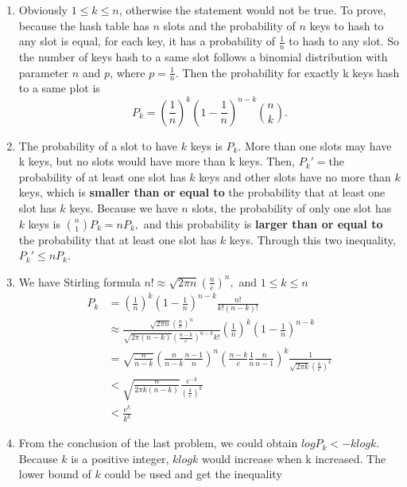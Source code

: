 \documentclass{assignment}
\begin{document}
    \maketitle

    \newpage

    \begin{homeworkProblem}
	\begin{enumerate}
	\item
	Obviously $1 \leq k \leq n$, otherwise the statement would not be true. To prove, because the hash table has $n$ slots and the probability of $n$ keys to hash to any slot is equal, for each key, it has a probability of $\frac{1}{n}$ to hash to any slot. So the number of keys hash to a same slot follows a binomial distribution with parameter $n$ and $p$, where $p=\frac{1}{n}$. Then the probability for exactly k keys hash to a same plot is $$P_k = \left(\frac{1}{n}\right)^k \left(1-\frac{1}{n}\right)^{n-k} \binom n k.$$
	\item The probability of a slot to have $k$ keys is $P_k$. More than one slots may have k keys, but no slots would have more than k keys. Then, $P_k' = $the probability of at least one slot has $k$ keys and other slots have no more than $k$ keys, which is \textbf{smaller than or equal to} the probability that at least one slot has $k$ keys. Because we have $n$ slots, the probability of only one slot has $k$ keys is $\binom n 1 P_k = nP_k,$ and this probability is \textbf{larger than or equal to} the probability that at least one slot has $k$ keys. Through this two inequality, $P_k' \leq nP_k$.
	\item We have Stirling formula $n! \approx \sqrt{2\pi n}\left(\frac{n}{e}\right)^n,$ and $1 \leq k\leq n$
		\begin{equation*}
	\begin{aligned}
	P_k &= \left(\frac{1}{n}\right)^k \left(1-\frac{1}{n}\right)^{n-k} \frac{n!}{k!(n-k)!} \\
	&\approx \frac{\sqrt{2 \pi n}\left(\frac{n}{e}\right)^n}{\sqrt{2 \pi (n-k)}\left(\frac{n-k}{e}\right)^{n-k}k!} \left(\frac{1}{n}\right)^k \left(1-\frac{1}{n}\right)^{n-k} \\
	&=\sqrt{ \frac{n}{n-k}} \left(\frac{n}{n-k} \frac{n-1}{n}\right)^n \left(\frac{n-k}{e} \frac{1}{n}\frac{n}{n-1}\right)^{k} \frac{1}{\sqrt{2 \pi k}\left(\frac{k}{e}\right)^k} \\
	& < \sqrt{ \frac{n}{2 \pi k(n-k)}}   \frac{e^{-k}}{\left(\frac{k}{e}\right)^k} \\
	&< \frac{e^k}{k^k}
	\end{aligned}
	\end{equation*}
	\item From the conclusion of the last problem, we could obtain $logP_k < -klogk$. Because $k$ is a positive integer, $klogk$ would increase when k increased. The lower bound of $k$ could be used and get the inequality 
	

\end{enumerate}
\end{homeworkProblem}
\end{document}
